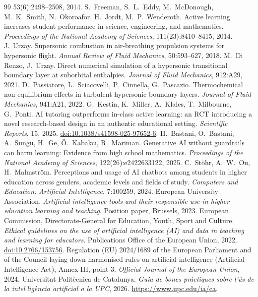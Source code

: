 \documentclass[11pt]{article}
\begin{document}
\begin{thebibliography}{99}
53(6):2498--2508, 2014.
 S.\ Freeman, S.\ L.\ Eddy, M.\ McDonough, M.\ K.\ Smith, N.\ Okoroafor,
H.\ Jordt, M.\ P.\ Wenderoth. Active learning increases student performance in science,
engineering, and mathematics. \emph{Proceedings of the National Academy of Sciences},
111(23):8410--8415, 2014.
 J.\ Urzay. Supersonic combustion in air-breathing propulsion systems for
hypersonic flight. \emph{Annual Review of Fluid Mechanics}, 50:593--627, 2018.
 M.\ Di Renzo, J.\ Urzay. Direct numerical simulation of a
hypersonic transitional boundary layer at suborbital enthalpies. \emph{Journal of Fluid
Mechanics}, 912:A29, 2021.
 D.\ Passiatore, L.\ Sciacovelli, P.\ Cinnella, G.\ Pascazio.
Thermochemical non-equilibrium effects in turbulent hypersonic boundary layers.
\emph{Journal of Fluid Mechanics}, 941:A21, 2022.
 G.\ Kestin, K.\ Miller, A.\ Klales, T.\ Milbourne, G.\ Ponti. AI tutoring
outperforms in-class active learning: an RCT introducing a novel research-based design in an
authentic educational setting. \emph{Scientific Reports}, 15, 2025.
\href{https://doi.org/10.1038/s41598-025-97652-6}{doi:10.1038/s41598-025-97652-6}.
 H.\ Bastani, O.\ Bastani, A.\ Sungu, H.\ Ge, \"O.\ Kabakc\i{}, R.\
Mariman. Generative AI without guardrails can harm learning: Evidence from high school
mathematics. \emph{Proceedings of the National Academy of Sciences}, 122(26):e2422633122,
2025.
 C.\ St\"ohr, A.\ W.\ Ou, H.\ Malmstr\"om. Perceptions and usage of AI
chatbots among students in higher education across genders, academic levels and fields of
study. \emph{Computers and Education: Artificial Intelligence}, 7:100259, 2024.
\bibitem{EUA2023} European University Association. \emph{Artificial intelligence tools and
their responsible use in higher education learning and teaching}. Position paper,
Brussels, 2023.
 European Commission, Directorate-General for Education, Youth, Sport and
Culture. \emph{Ethical guidelines on the use of artificial intelligence (AI) and data in
teaching and learning for educators}. Publications Office of the European Union, 2022.
\href{https://data.europa.eu/doi/10.2766/153756}{doi:10.2766/153756}.
\bibitem{AIAct2024} Regulation (EU) 2024/1689 of the European Parliament and of the Council
laying down harmonised rules on artificial intelligence (Artificial Intelligence Act),
Annex III, point 3. \emph{Official Journal of the European Union}, 2024.
\bibitem{UPCAI2026} Universitat Polit\`ecnica de Catalunya. \emph{Guia de bones pr\`actiques
sobre l'\'us de la intel$\cdot$lig\`encia artificial a la UPC}, 2026.
\url{https://www.upc.edu/ia/ca}.

\end{thebibliography}
\end{document}
